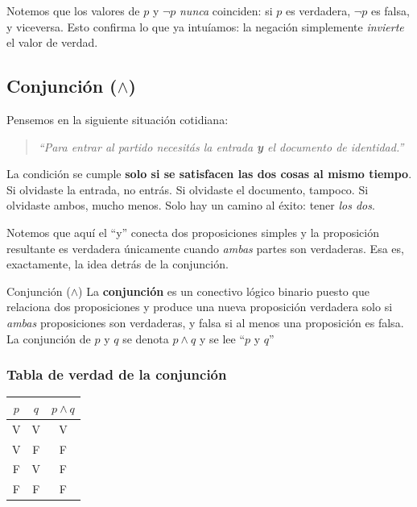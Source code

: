 \noindent Notemos que los valores de $p$ y $\lnot p$ \emph{nunca} coinciden: si $p$ es verdadera, $\lnot p$ es falsa, y viceversa. Esto confirma lo que ya intuíamos: la negación simplemente \emph{invierte} el valor de verdad.

\subsection{\texorpdfstring{Conjunción ($\land$)}{Conjuncion}}

Pensemos en la siguiente situación cotidiana:

\begin{quote}
    \textit{``Para entrar al partido necesitás la entrada \textbf{y} el documento de identidad.''}
\end{quote}

\noindent La condición se cumple \textbf{solo si se satisfacen las dos cosas al mismo tiempo}. Si olvidaste la entrada, no entrás. Si olvidaste el documento, tampoco. Si olvidaste ambos, mucho menos. Solo hay un camino al éxito: tener \emph{los dos}.

Notemos que aquí el ``y'' conecta dos proposiciones simples y la proposición resultante es verdadera únicamente cuando \emph{ambas} partes son verdaderas. Esa es, exactamente, la idea detrás de la conjunción.

\begin{dfn}{Conjunción ($\land$)}
    La \textbf{conjunción} es un conectivo lógico binario puesto que relaciona dos proposiciones y produce una nueva proposición verdadera solo si \emph{ambas} proposiciones son verdaderas, y falsa si al menos una proposición es falsa. La conjunción de $p$ y $q$ se denota $p \land q$ y se lee ``$p$ y $q$''
\end{dfn}

\subsubsection*{Tabla de verdad de la conjunción}
\begin{center}
    \renewcommand{\arraystretch}{1.4}
    \begin{tabular}{|c|c|c|}
        \hline
        \textbf{$p$} & \textbf{$q$} & \textbf{$p \land q$} \\
        \hline
        V & V & V \\
        \hline
        V & F & F \\
        \hline
        F & V & F \\
        \hline
        F & F & F \\
        \hline
    \end{tabular}
\end{center}

